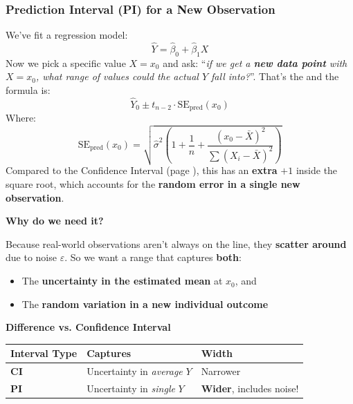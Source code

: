 \subsubsection{Prediction Interval (PI) for a New Observation}\label{subsubsection: Prediction Interval for a New Observation}

We've fit a regression model:
\begin{equation*}
    \hat{Y} = \hat{\beta}_0 + \hat{\beta}_1 X    
\end{equation*}
Now we pick a specific value $X = x_0$ and ask: ``\emph{if we get a \textbf{new data point} with $X = x_0$, what range of values could the actual $Y$ fall into?}''. That's the  and the formula is:
\begin{equation}
    \hat{Y}_0 \pm t_{n-2} \cdot \text{SE}_{\text{pred}}(x_0)
\end{equation}
Where:
\begin{equation}
    \text{SE}_{\text{pred}}(x_0) = \sqrt{ \hat{\sigma}^2 \left( 1 + \dfrac{1}{n} + \dfrac{\left(x_0 - \bar{X}\right)^2}{\displaystyle\sum \left(X_i - \bar{X}\right)^2} \right) }
\end{equation}
Compared to the Confidence Interval (page \pageref{subsubsection: Confidence Interval for the Mean Response}), this has an \textbf{extra} $+1$ inside the square root, which accounts for the \textbf{random error in a single new observation}.

\highspace
\begin{flushleft}
    \textcolor{Green3}{ \textbf{Why do we need it?}}
\end{flushleft}
Because real-world observations aren't always on the line, they \textbf{scatter around} due to noise $\varepsilon$. So we want a range that captures \textbf{both}:
\begin{itemize}
    \item The \textbf{uncertainty in the estimated mean} at $x_0$, and
    \item The \textbf{random variation in a new individual outcome}
\end{itemize}

\highspace
\begin{flushleft}
    \textcolor{Green3}{ \textbf{Difference vs. Confidence Interval}}
\end{flushleft}
\begin{table}[!htp]
    \centering
    \begin{tabular}{@{} l l l @{}}
        \toprule
        Interval Type & Captures & Width \\
        \midrule
        \textbf{CI} & Uncertainty in \emph{average} $Y$ & Narrower \\
        \textbf{PI} & Uncertainty in \emph{single} $Y$  & \textbf{Wider}, includes noise! \\
        \bottomrule
    \end{tabular}
\end{table}

